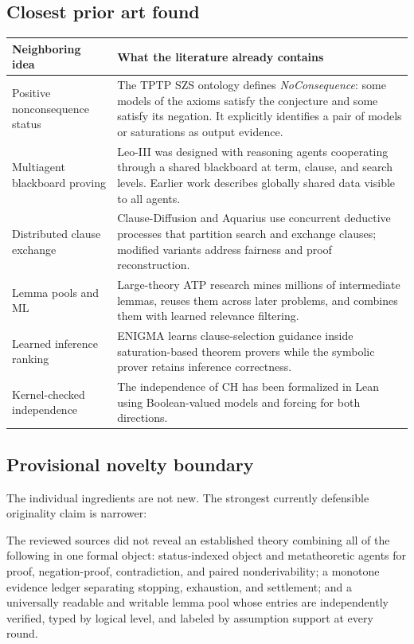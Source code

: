 \documentclass[11pt]{article}
\theoremstyle{definition}
\theoremstyle{remark}
\begin{document}
\subsection{Closest prior art found}
\begin{longtable}{@{}p{}p{}@{}}
\toprule
\textbf{Neighboring idea} & \textbf{What the literature already contains} \\
\midrule
Positive nonconsequence status & The TPTP SZS ontology defines \emph{NoConsequence}: some models of the axioms satisfy the conjecture and some satisfy its negation. It explicitly identifies a pair of models or saturations as output evidence. \\
Multiagent blackboard proving & Leo-III was designed with reasoning agents cooperating through a shared blackboard at term, clause, and search levels. Earlier work describes globally shared data visible to all agents. \\
Distributed clause exchange & Clause-Diffusion and Aquarius use concurrent deductive processes that partition search and exchange clauses; modified variants address fairness and proof reconstruction. \\
Lemma pools and ML & Large-theory ATP research mines millions of intermediate lemmas, reuses them across later problems, and combines them with learned relevance filtering. \\
Learned inference ranking & ENIGMA learns clause-selection guidance inside saturation-based theorem provers while the symbolic prover retains inference correctness. \\
Kernel-checked independence & The independence of CH has been formalized in Lean using Boolean-valued models and forcing for both directions. \\
\bottomrule
\end{longtable}

\subsection{Provisional novelty boundary}
The individual ingredients are not new. The strongest currently defensible originality claim is narrower:

\begin{notebox}
The reviewed sources did not reveal an established theory combining all of the following in one formal object: status-indexed object and metatheoretic agents for proof, negation-proof, contradiction, and paired nonderivability; a monotone evidence ledger separating stopping, exhaustion, and settlement; and a universally readable and writable lemma pool whose entries are independently verified, typed by logical level, and labeled by assumption support at every round.
\end{notebox}
\end{document}
